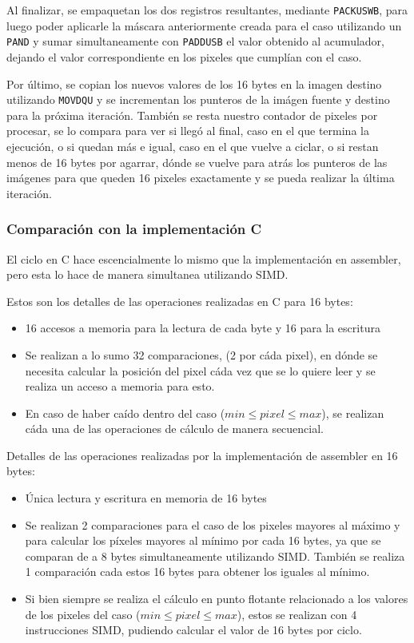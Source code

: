 Al finalizar, se empaquetan los dos registros resultantes, mediante \texttt{PACKUSWB}, para luego poder aplicarle la máscara anteriormente creada para el caso utilizando un \texttt{PAND} y sumar simultaneamente con \texttt{PADDUSB} el valor obtenido al acumulador, dejando el valor correspondiente en los pixeles que cumplían con el caso.

Por último, se copian los nuevos valores de los 16 bytes en la imagen destino utilizando \texttt{MOVDQU} y se incrementan los punteros de la imágen fuente y destino para la próxima iteración. También se resta nuestro contador de pixeles por procesar, se lo compara para ver si llegó al final, caso en el que termina la ejecución, o si quedan más e igual, caso en el que vuelve a ciclar, o si restan menos de 16 bytes por agarrar, dónde se vuelve para atrás los punteros de las imágenes para que queden 16 pixeles exactamente y se pueda realizar la última iteración.

\subsubsection{Comparación con la implementación C}
El ciclo en C hace escencialmente lo mismo que la implementación en assembler, pero esta lo hace de manera simultanea utilizando SIMD. 

Estos son los detalles de las operaciones realizadas en C para 16 bytes:
\begin{itemize}
\item 16 accesos a memoria para la lectura de cada byte y 16 para la escritura
\item Se realizan a lo sumo 32 comparaciones, (2 por cáda pixel), en dónde se necesita calcular la posición del pixel cáda vez que se lo quiere leer y se realiza un acceso a memoria para esto.
\item En caso de haber caído dentro del caso ($min \leq pixel \leq max$), se realizan cáda una de las operaciones de cálculo de manera secuencial.
\end{itemize}
Detalles de las operaciones realizadas por la implementación de assembler en 16 bytes:
\begin{itemize}
\item Única lectura y escritura en memoria de 16 bytes
\item Se realizan 2 comparaciones para el caso de los pixeles mayores al máximo y para calcular los píxeles mayores al mínimo por cada 16 bytes, ya que se comparan de a 8 bytes simultaneamente utilizando SIMD. También se realiza 1 comparación cada estos 16 bytes para obtener los iguales al mínimo.
\item Si bien siempre se realiza el cálculo en punto flotante relacionado a los valores de los pixeles del caso ($min \leq pixel \leq max$), estos se realizan con 4 instrucciones SIMD, pudiendo calcular el valor de 16 bytes por ciclo.
\end{itemize}

